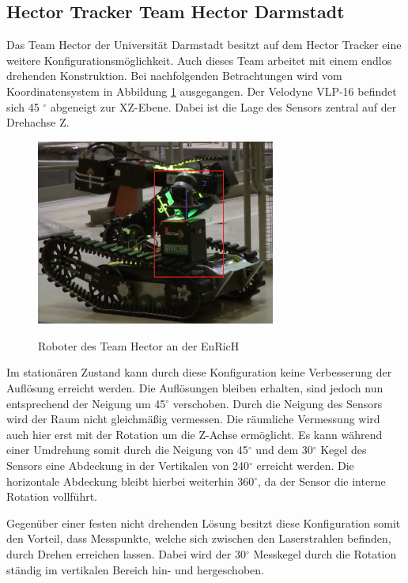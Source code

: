 \subsection{Hector Tracker Team Hector Darmstadt}
 \label{subsec:hector}
Das Team Hector der Universität Darmstadt besitzt auf dem Hector Tracker eine weitere Konfigurationsmöglichkeit. Auch dieses Team arbeitet mit einem endlos drehenden Konstruktion. Bei nachfolgenden Betrachtungen wird vom Koordinatensystem in Abbildung \ref{fig:hector} ausgegangen. Der Velodyne VLP-16 befindet sich 45 $^\circ$ abgeneigt zur XZ-Ebene. Dabei ist die Lage des Sensors zentral auf der Drehachse Z.

\begin{figure}[H]
	\centering
	\includegraphics[width=0.7\textwidth]
	{resources/hector_cop.PNG}
	\caption[Roboter des Team Hector EnRicH]{Roboter des Team Hector an der EnRicH} \protect\cite{hector}
	\label{fig:hector}
\end{figure}

Im stationären Zustand kann durch diese Konfiguration keine Verbesserung der Auflösung erreicht werden. Die Auflösungen bleiben erhalten, sind jedoch nun entsprechend der Neigung um 45$^\circ$ verschoben. Durch die Neigung des Sensors wird der Raum nicht gleichmäßig vermessen. Die räumliche Vermessung wird auch hier erst mit der Rotation um die Z-Achse ermöglicht. Es kann während einer Umdrehung somit durch die Neigung von 45$^\circ$ und dem 30$^\circ$ Kegel des Sensors eine Abdeckung in der Vertikalen von 240$^\circ$ erreicht werden. Die horizontale Abdeckung bleibt hierbei weiterhin 360$^\circ$, da der Sensor die interne Rotation vollführt.

Gegenüber einer festen nicht drehenden Lösung besitzt diese Konfiguration somit den Vorteil, dass Messpunkte, welche sich zwischen den Laserstrahlen befinden, durch Drehen erreichen lassen. Dabei wird der 30$^\circ$ Messkegel durch die Rotation ständig im vertikalen Bereich hin- und hergeschoben.

